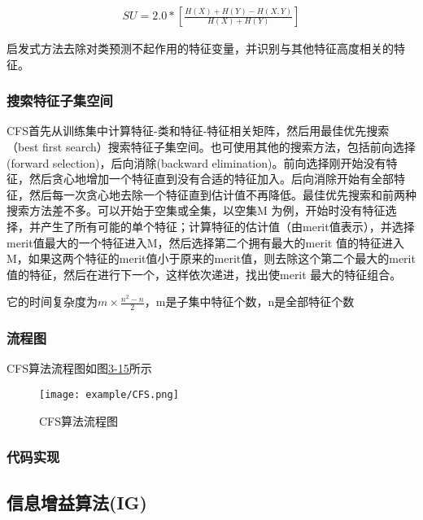\begin{align}
SU =2.0 * [\frac{H(X) + H(Y) - H(X,Y)}{H(X) + H(Y)}]
\end{align}

启发式方法去除对类预测不起作用的特征变量，并识别与其他特征高度相关的特征。

\subsubsection{搜索特征子集空间}

CFS首先从训练集中计算特征-类和特征-特征相关矩阵，然后用最佳优先搜索（best first search）搜索特征子集空间。也可使用其他的搜索方法，包括前向选择(forward selection)，后向消除(backward elimination)。前向选择刚开始没有特征，然后贪心地增加一个特征直到没有合适的特征加入。后向消除开始有全部特征，然后每一次贪心地去除一个特征直到估计值不再降低。最佳优先搜索和前两种搜索方法差不多。可以开始于空集或全集，以空集M 为例，开始时没有特征选择，并产生了所有可能的单个特征；计算特征的估计值（由merit值表示），并选择merit值最大的一个特征进入M，然后选择第二个拥有最大的merit 值的特征进入M，如果这两个特征的merit值小于原来的merit值，则去除这个第二个最大的merit值的特征，然后在进行下一个，这样依次递进，找出使merit 最大的特征组合。

它的时间复杂度为$m \times \frac{n^2 - n}{2}$，m是子集中特征个数，n是全部特征个数

\subsubsection{流程图}

CFS算法流程图如图\href{fig:3-15}{3-15}所示

\begin{figure}[!htp]
\centering
\texttt{[image: example/CFS.png]}
\caption{CFS算法流程图}
\label{fig1:3-15}
\end{figure}

\subsubsection{代码实现}



\subsection{信息增益算法(IG)}

